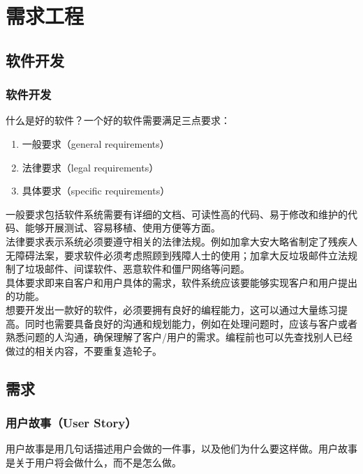\chapter{需求工程}

\section{软件开发}

\subsection{软件开发}

什么是好的软件？一个好的软件需要满足三点要求：

\begin{enumerate}
    \item 一般要求（general requirements）
    \item 法律要求（legal requirements）
    \item 具体要求（specific requirements）
\end{enumerate}

一般要求包括软件系统需要有详细的文档、可读性高的代码、易于修改和维护的代码、能够开展测试、容易移植、使用方便等方面。\\

法律要求表示系统必须要遵守相关的法律法规。例如加拿大安大略省制定了残疾人无障碍法案，要求软件必须考虑照顾到残障人士的使用；加拿大反垃圾邮件立法规制了垃圾邮件、间谍软件、恶意软件和僵尸网络等问题。\\

具体要求即来自客户和用户具体的需求，软件系统应该要能够实现客户和用户提出的功能。\\

想要开发出一款好的软件，必须要拥有良好的编程能力，这可以通过大量练习提高。同时也需要具备良好的沟通和规划能力，例如在处理问题时，应该与客户或者熟悉问题的人沟通，确保理解了客户/用户的需求。编程前也可以先查找别人已经做过的相关内容，不要重复造轮子。

\newpage

\section{需求}

\subsection{用户故事（User Story）}

用户故事是用几句话描述用户会做的一件事，以及他们为什么要这样做。用户故事是关于用户将会做什么，而不是怎么做。\\

